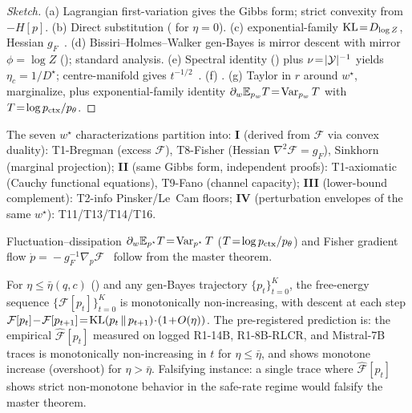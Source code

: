 \begin{proof}[Sketch]
(a) Lagrangian first-variation gives the Gibbs form; strict
convexity from $-H[p]$.  (b) Direct substitution
( for $\eta\!=\!0$).  (c)
exponential-family $\operatorname{KL}\!=\!D_{\log Z}$, Hessian $g_F$~\citep[Ch.~3]{amari2000methods}.
(d) Bissiri--Holmes--Walker gen-Bayes is mirror descent with
mirror $\phi\!=\!\log Z$ (); standard
analysis.  (e) Spectral identity ()
plus $\nu\!=\!|\mathcal{Y}|^{-1}$ yields $\eta_c\!=\!1/D^\star$;
centre-manifold gives $t^{-1/2}$~\citep[Ch.~18]{wiggins2003introduction}.
(f) \citet[Prop.~4.1]{cuturi2013sinkhorn}.  (g) Taylor in $r$
around $w^\star$, marginalize, plus exponential-family identity
$\partial_w\mathbb{E}_{p_w}T\!=\!\operatorname{Var}_{p_w}T$ with $T\!=\!\log p_{\mathrm{ctx}}/p_\theta$.
\end{proof}

\begin{corollary}
\label{cor:taxonomy}
The seven $w^\star$ characterizations partition into:
\textbf{I} (derived from $\mathcal{F}$ via convex duality):
T1-Bregman (excess $\mathcal{F}$), T8-Fisher (Hessian
$\nabla^2\mathcal{F}\!=\!g_F$), Sinkhorn (marginal projection);
\textbf{II} (same Gibbs form, independent proofs): T1-axiomatic
(Cauchy functional equations), T9-Fano (channel capacity);
\textbf{III} (lower-bound complement): T2-info Pinsker/Le~Cam
floors;
\textbf{IV} (perturbation envelopes of the same $w^\star$):
T11/T13/T14/T16.
\end{corollary}

\begin{remark}
Fluctuation--dissipation $\partial_w\mathbb{E}_{p^\star}T\!=\!\operatorname{Var}_{p^\star}T$
($T\!=\!\log p_{\mathrm{ctx}}/p_\theta$) and Fisher gradient flow
$\dot p\!=\!-g_F^{-1}\nabla_p\mathcal{F}$~\citep[Ch.~5]{amari2000methods}
follow from the master theorem.
\end{remark}

\begin{corollary}
\label{cor:F-monotone-descent}
For $\eta\!\le\!\bar\eta(q,c)$ () and any
gen-Bayes trajectory $\{p_t\}_{t=0}^{K}$, the free-energy sequence
$\{\mathcal{F}[p_t]\}_{t=0}^{K}$ is monotonically non-increasing,
with descent at each step
$\mathcal{F}[p_t]\!-\!\mathcal{F}[p_{t+1}]\!=\!\KL(p_t\,\|\,p_{t+1})\!\cdot\!(1\!+\!O(\eta))$.
The pre-registered prediction is: the empirical
$\widehat{\mathcal{F}}[p_t]$ measured on logged R1-14B,
R1-8B-RLCR, and Mistral-7B traces is monotonically non-increasing
in $t$ for $\eta\!\le\!\bar\eta$, and shows monotone increase
(overshoot) for $\eta\!>\!\bar\eta$.  Falsifying instance: a
single trace where $\widehat{\mathcal{F}}[p_t]$ shows strict
non-monotone behavior in the safe-rate regime would falsify
the master theorem.
\end{corollary}


